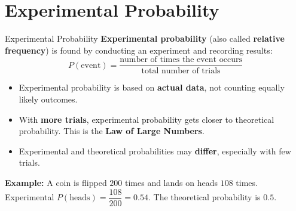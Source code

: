 \section{Experimental Probability}

\begin{quickReview}{Experimental Probability}
\textbf{Experimental probability} (also called \textbf{relative frequency}) is found by conducting an experiment and recording results:
$$P(\text{event}) = \frac{\text{number of times the event occurs}}{\text{total number of trials}}$$

\begin{itemize}[leftmargin=*]
    \item Experimental probability is based on \textbf{actual data}, not counting equally likely outcomes.
    \item With \textbf{more trials}, experimental probability gets closer to theoretical probability. This is the \textbf{Law of Large Numbers}.
    \item Experimental and theoretical probabilities may \textbf{differ}, especially with few trials.
\end{itemize}

\medskip
\textbf{Example:} A coin is flipped $200$ times and lands on heads $108$ times. Experimental $P(\text{heads}) = \dfrac{108}{200} = 0.54$. The theoretical probability is $0.5$.
\end{quickReview}

